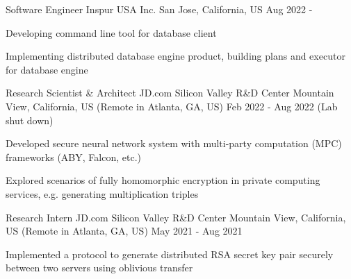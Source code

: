 


\begin{cventries}


\cventry
{Software Engineer} %
{Inspur USA Inc.} %
{San Jose, California, US} %
{Aug 2022 - } %
{ %
	\begin{cvitems}
		\item {Developing command line tool for database client}
		\item {Implementing distributed database engine product, building plans and executor for database engine}
	\end{cvitems}
}


\cventry
{Research Scientist \& Architect} %
{JD.com Silicon Valley R\&D Center} %
{Mountain View, California, US (Remote in Atlanta, GA, US)} %
{Feb 2022 - Aug 2022 (Lab shut down)} %
{ %
\begin{cvitems}
\item {Developed secure neural network system with multi-party computation (MPC) frameworks (ABY, Falcon, etc.)}
\item {Explored scenarios of fully homomorphic encryption in private computing services, e.g. generating multiplication triples}
\end{cvitems}
}


\cventry
{Research Intern} %
{JD.com Silicon Valley R\&D Center} %
{Mountain View, California, US (Remote in Atlanta, GA, US)} %
{May 2021 - Aug 2021} %
{ %
\begin{cvitems}
\item {Implemented a protocol to generate distributed RSA secret key pair securely between two servers using oblivious transfer}
\end{cvitems}
}


\end{cventries}